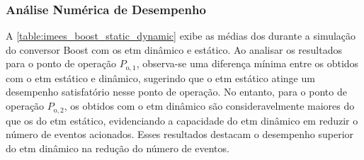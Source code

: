 \subsubsection{Análise Numérica de Desempenho}

A \autoref{table:imees_boost_static_dynamic} exibe as médias dos  durante a simulação do conversor Boost com os \acrshort{etm} dinâmico e estático. Ao analisar os resultados para o ponto de operação $P_{\mathrm{o}, 1}$, observa-se uma diferença mínima entre os  obtidos com o \acrshort{etm} estático e dinâmico, sugerindo que o \acrshort{etm} estático atinge um desempenho satisfatório nesse ponto de operação. No entanto, para o ponto de operação $P_{\mathrm{o}, 2}$, os  obtidos com o \acrshort{etm} dinâmico são consideravelmente maiores do que os do \acrshort{etm} estático, evidenciando a capacidade do \acrshort{etm} dinâmico em reduzir o número de eventos acionados. Esses resultados destacam o desempenho superior do \acrshort{etm} dinâmico na redução do número de eventos.

